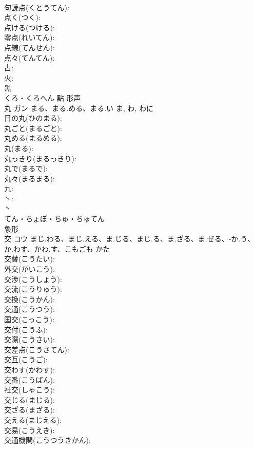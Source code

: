 \documentclass[8pt]{extreport}
\begin{document}
\begin{CJK}{UTF8}{min}
\\	句読点(くとうてん): 
\\	点く(つく): 
\\	点ける(つける): 
\\	零点(れいてん): 
\\	点線(てんせん): 
\\	点々(てんてん): 
\\	占: 
\\	火: 
\\	黑	
\\	くろ・くろへん	點	形声 
\\	丸	ガン	まる、まる.める、まる.い	ま, わ, わに	
\\	日の丸(ひのまる): 
\\	丸ごと(まるごと): 
\\	丸める(まるめる): 
\\	丸(まる): 
\\	丸っきり(まるっきり): 
\\	丸で(まるで): 
\\	丸々(まるまる): 
\\	九: 
\\	丶: 
\\	丶	
\\	てん・ちょぼ・ちゅ・ちゅてん	
\\	象形 
\\	交	コウ	まじ.わる、まじ.える、ま.じる、まじ.る、ま.ざる、ま.ぜる、-か.う、か.わす、かわ.す、こもごも	かた	
\\	交替(こうたい): 
\\	外交(がいこう): 
\\	交渉(こうしょう): 
\\	交流(こうりゅう): 
\\	交換(こうかん): 
\\	交通(こうつう): 
\\	国交(こっこう): 
\\	交付(こうふ): 
\\	交際(こうさい): 
\\	交差点(こうさてん): 
\\	交互(こうご): 
\\	交わす(かわす): 
\\	交番(こうばん): 
\\	社交(しゃこう): 
\\	交じる(まじる): 
\\	交ざる(まざる): 
\\	交える(まじえる): 
\\	交易(こうえき): 
\\	交通機関(こうつうきかん): 

\end{CJK}
\end{document}

